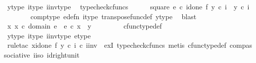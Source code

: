 \begin{isabellebody}
\ y{\isacharunderscore}{\kern0pt}type\ i{\isacharunderscore}{\kern0pt}type\ i{\isacharunderscore}{\kern0pt}inv{\isacharunderscore}{\kern0pt}type\ \isamarkupfalse%
\ typecheck{\isacharunderscore}{\kern0pt}cfuncs\isanewline
\isanewline
\ \ \ \ \isamarkupfalse%
\ square{\isacharcolon}{\kern0pt}\ {\isachardoublequoteopen}e\ {\isasymcirc}\isactrlsub c\ {\isacharparenleft}{\kern0pt}id{\isacharparenleft}{\kern0pt}one{\isacharparenright}{\kern0pt}\ {\isasymtimes}\isactrlsub f\ {\isacharparenleft}{\kern0pt}y\ {\isasymcirc}\isactrlsub c\ i{\isacharparenright}{\kern0pt}\isactrlsup {\isasymsharp}{\isacharparenright}{\kern0pt}\ {\isacharequal}{\kern0pt}\ y\ {\isasymcirc}\isactrlsub c\ i{\isachardoublequoteclose}\isanewline
\ \ \ \ \ \ \isamarkupfalse%
\ comp{\isacharunderscore}{\kern0pt}type\ e{\isacharunderscore}{\kern0pt}defn\ i{\isacharunderscore}{\kern0pt}type\ transpose{\isacharunderscore}{\kern0pt}func{\isacharunderscore}{\kern0pt}def\ y{\isacharunderscore}{\kern0pt}type\ \isamarkupfalse%
\ blast\isanewline
\ \ \ \ \isamarkupfalse%
\ \isamarkupfalse%
\ {\isachardoublequoteopen}{\isasymexists}x{\isachardot}{\kern0pt}\ x\ {\isasymin}\isactrlsub c\ domain\ e\ {\isasymand}\ e\ {\isasymcirc}\isactrlsub c\ x\ {\isacharequal}{\kern0pt}\ y{\isachardoublequoteclose}\ \isanewline
\ \ \ \ \ \ \isamarkupfalse%
\ cfunc{\isacharunderscore}{\kern0pt}type{\isacharunderscore}{\kern0pt}def\ \isamarkupfalse%
\ y{\isacharunderscore}{\kern0pt}type\ i{\isacharunderscore}{\kern0pt}type\ i{\isacharunderscore}{\kern0pt}inv{\isacharunderscore}{\kern0pt}type\ e{\isacharunderscore}{\kern0pt}type\ \isanewline
\ \ \ \ \ \ \isamarkupfalse%
\ {\isacharparenleft}{\kern0pt}rule{\isacharunderscore}{\kern0pt}tac\ x{\isacharequal}{\kern0pt}{\isachardoublequoteopen}{\isacharparenleft}{\kern0pt}id{\isacharparenleft}{\kern0pt}one{\isacharparenright}{\kern0pt}\ {\isasymtimes}\isactrlsub f\ {\isacharparenleft}{\kern0pt}y\ {\isasymcirc}\isactrlsub c\ i{\isacharparenright}{\kern0pt}\isactrlsup {\isasymsharp}{\isacharparenright}{\kern0pt}\ {\isasymcirc}\isactrlsub c\ i{\isacharunderscore}{\kern0pt}inv{\isachardoublequoteclose}\ \ exI{\isacharcomma}{\kern0pt}\ typecheck{\isacharunderscore}{\kern0pt}cfuncs{\isacharcomma}{\kern0pt}\ metis\ cfunc{\isacharunderscore}{\kern0pt}type{\isacharunderscore}{\kern0pt}def\ comp{\isacharunderscore}{\kern0pt}associative\ i{\isacharunderscore}{\kern0pt}iso\ id{\isacharunderscore}{\kern0pt}right{\isacharunderscore}{\kern0pt}unit{}{\isacharparenright}{\kern0pt}\isanewline

\end{isabellebody}
